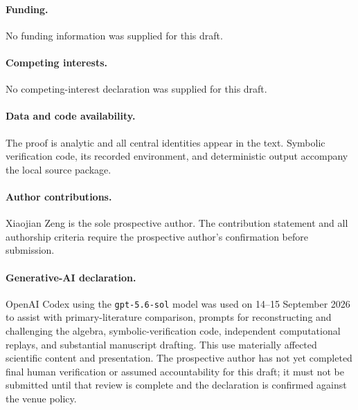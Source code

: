 \documentclass[11pt]{article}
\theoremstyle{remark}
\begin{document}
\paragraph{Funding.}
No funding information was supplied for this draft.

\paragraph{Competing interests.}
No competing-interest declaration was supplied for this draft.

\paragraph{Data and code availability.}
The proof is analytic and all central identities appear in the text.
Symbolic verification code, its recorded environment, and deterministic
output accompany the local source package.

\paragraph{Author contributions.}
Xiaojian Zeng is the sole prospective author. The contribution statement and
all authorship criteria require the prospective author's confirmation before
submission.

\paragraph{Generative-AI declaration.}
OpenAI Codex using the \texttt{gpt-5.6-sol} model was used on
14--15 September 2026 to assist with primary-literature comparison, prompts
for reconstructing and challenging the algebra, symbolic-verification code,
independent computational replays, and substantial manuscript drafting.
This use materially affected scientific content and presentation. The
prospective author has not yet completed final human verification or assumed
accountability for this draft; it must not be submitted until that review is
complete and the declaration is confirmed against the venue policy.



\end{document}
